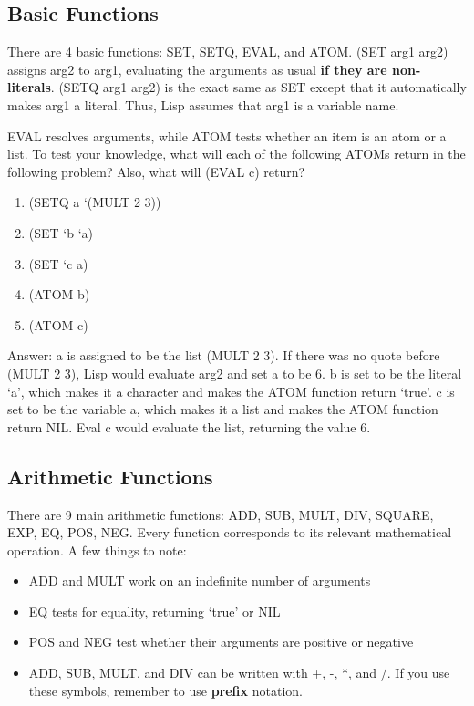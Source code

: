 \documentclass{pset_template}
\begin{document}
\subsection{Basic Functions}
There are 4 basic functions: SET, SETQ, EVAL, and ATOM.
(SET arg1 arg2) assigns arg2 to arg1, evaluating the arguments as usual
\textbf{if they are non-literals}.
(SETQ arg1 arg2) is the exact same as SET except that it automatically makes arg1
a literal.
Thus, Lisp assumes that arg1 is a variable name.

EVAL resolves arguments, while ATOM tests whether an item is an atom or a list.
To test your knowledge, what will each of the following ATOMs return in
the following problem?
Also, what will (EVAL c) return?
\begin{enumerate}
    \item (SETQ a `(MULT 2 3))
    \item (SET `b `a)
    \item (SET `c a)
    \item (ATOM b)
    \item (ATOM c)
\end{enumerate}
Answer: a is assigned to be the list (MULT 2 3).
If there was no quote before (MULT 2 3), Lisp would evaluate arg2 and set
a to be 6.
b is set to be the literal `a', which makes it a character and makes
the ATOM function return `true'.
c is set to be the variable a, which makes it a list and makes the ATOM function
return NIL.
Eval c would evaluate the list, returning the value 6.

\subsection{Arithmetic Functions}
There are 9 main arithmetic functions: ADD, SUB, MULT, DIV, SQUARE,
EXP, EQ, POS, NEG.
Every function corresponds to its relevant mathematical operation.
A few things to note:
\begin{itemize}
    \item ADD and MULT work on an indefinite number of arguments
    \item EQ tests for equality, returning `true' or NIL
    \item POS and NEG test whether their arguments are positive or negative
    \item ADD, SUB, MULT, and DIV can be written with +, -, *, and /.
    If you use these symbols, remember to use \textbf{prefix} notation.
\end{itemize}
\end{document}

